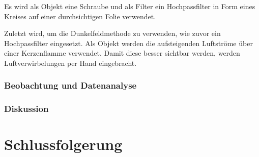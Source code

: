 \documentclass[
	a4paper,
	12pt,
	pagesize,
	ngerman
]{scrartcl}
\begin{document}
		Es wird als Objekt eine Schraube und als Filter ein Hochpassfilter in Form eines Kreises auf einer durchsichtigen Folie verwendet.

		Zuletzt wird, um die Dunkelfeldmethode zu verwenden, wie zuvor ein Hochpassfilter eingesetzt.
		Als Objekt werden die aufsteigenden Luftströme über einer Kerzenflamme verwendet.
		Damit diese besser sichtbar werden, werden Luftverwirbelungen per Hand eingebracht.

	\subsubsection*{Beobachtung und Datenanalyse}

	\subsubsection*{Diskussion}

	\section{Schlussfolgerung}

	\printbibliography
\end{document}
